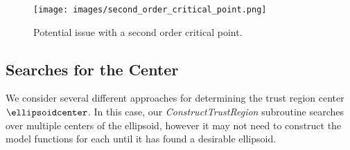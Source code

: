 \begin{figure}[h]
    \centering
    \texttt{[image: images/second\_order\_critical\_point.png]}
    \caption{Potential issue with a second order critical point.}
    \label{fbns}
\end{figure}





\subsection{Searches for the Center}

We consider several different approaches for determining the trust region center $\ellipsoidcenter$.
In this case, our \emph{ConstructTrustRegion} subroutine searches over multiple centers of the ellipsoid, however it may not need to construct the model functions for each until it has found a desirable ellipsoid.






%            


